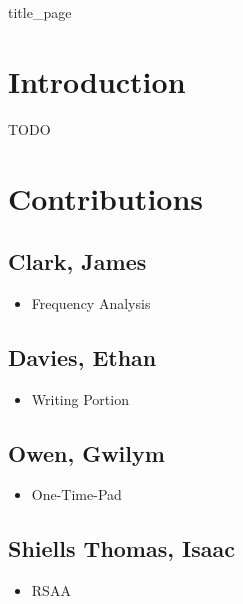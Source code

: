 \documentclass[11pt]{article}
\begin{document}
\raggedcolumns

{title_page}


\begin{multicols}{2}
	\begin{spacing}{1.125}
		\tableofcontents

		\section{Introduction}
		TODO





		\section{Contributions}
		\subsection{Clark, James}
		\begin{itemize}
			\item Frequency Analysis
		\end{itemize}
		\subsection{Davies, Ethan}
		\begin{itemize}
			\item Writing Portion
		\end{itemize}
		\subsection{Owen, Gwilym}
		\begin{itemize}
			\item One-Time-Pad
		\end{itemize}
		\subsection{Shiells Thomas, Isaac}
		\begin{itemize}
			\item RSAA
		\end{itemize}

		\printbibliography

	\end{spacing}
\end{multicols}
\end{document}
